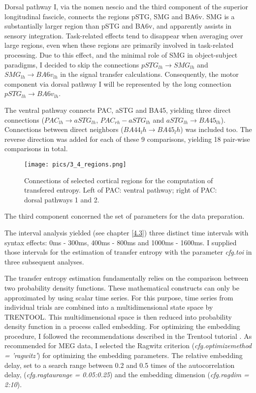 Dorsal pathway I, via the nomen nescio and the third component of the superior longitudinal fascicle, connects the regions pSTG, SMG and BA6v.
SMG is a substantially larger region than pSTG and BA6v, and apparently assists in sensory integration.
Task-related effects tend to disappear when averaging over large regions, even when these regions are primarily involved in task-related processing.
Due to this effect, and the minimal role of SMG in object-subject paradigms, I decided to skip the connections $pSTG_{lh} \rightarrow SMG_{lh}$ and $SMG_{lh} \rightarrow BA6v_{lh}$ in the signal transfer calculations.
Consequently, the motor component via dorsal pathway I will be represented by the long connection $pSTG_{lh} \rightarrow BA6v_{lh}$.

The ventral pathway connects PAC, aSTG and BA45, yielding three direct connections ($PAC_{lh} \rightarrow aSTG_{lh}$, $PAC_{rh}-aSTG_{lh}$ and $aSTG_{lh} \rightarrow BA45_{lh}$).
Connections between direct neighbors  ($BA44_lh \rightarrow BA45_lh$) was included too.
The reverse direction was added for each of these 9 comparisons, yielding 18 pair-wise comparisons in total.

\begin{figure}[h]
\begin{center}
\vspace{7mm}
\texttt{[image: pics/3\_4\_regions.png]}
\caption{\label{3.4.regions} Connections of selected cortical regions for the computation of transfered entropy. Left of PAC: ventral pathway; right of PAC: dorsal pathways 1 and 2.}
\end{center}
\end{figure}

The third component concerned the set of parameters for the data preparation.

The interval analysis yielded (see chapter \ref{4.3}) three distinct time intervals with syntax effects: 0ms - 300ms, 400ms - 800ms and 1000ms - 1600ms.
I supplied those intervals for the estimation of transfer entropy with the parameter \emph{cfg.toi} in three subsequent analyses.

The transfer entropy estimation fundamentally relies on the comparison between two probability density functions.
These mathematical constructs can only be approximated by using scalar time series.
For this purpose, time series from individual trials are combined into a multidimensional state space by TRENTOOL.
This multidimensional space is then reduced into probability density function in a process called embedding.
For optimizing the embedding procedure, I followed the recommendations described in the Trentool tutorial \cite{3.3.TrentoolTutorial}.	
As recommended for MEG data, I selected the Ragwitz criterion (\emph{cfg.optimizemethod = 'ragwitz'}) for optimizing the embedding parameters.
The relative embedding delay, set to a search range between 0.2 and 0.5 times of the autocorrelation delay,  (\emph{cfg.ragtaurange = 0.05:0.25}) and the embedding dimension (\emph{cfg.ragdim = 2:10}).

